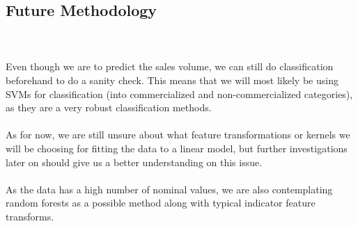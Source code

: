 \documentclass[psamsfonts]{amsart}
\begin{document}
\subsection*{Future Methodology}
\hfill \\
\\
Even though we are to predict the sales volume, we can still do classification beforehand to do a sanity check. This means that we will most likely be using SVMs for classification (into commercialized and non-commercialized categories), as they are a very robust classification methods.\\ \\
As for now, we are still unsure about what feature transformations or kernels we will be choosing for fitting the data to a linear model, but further investigations later on should give us a better understanding on this issue.\\
\\
As the data has a high number of nominal values, we are also contemplating random forests as a possible method along with typical indicator feature transforms.\\
\end{document}
